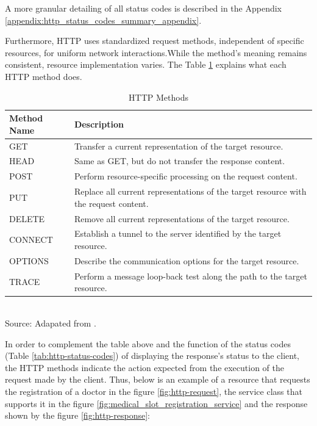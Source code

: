 A more granular detailing of all status codes is described in the Appendix \ref{appendix:http_status_codes_summary_appendix}.

Furthermore, HTTP uses standardized request methods, independent of specific resources, for uniform network interactions.While the method's meaning remains consistent, resource implementation varies. The Table \ref{tab:http-methods} explains what each HTTP method does.

\begin{table}[H]
\centering
\caption{HTTP Methods}
\label{tab:http-methods}
\begin{tabular}{lp{6cm}} %
\textbf{Method Name} & \textbf{Description} \\ \hline
GET & Transfer a current representation of the target resource. \\ \hline
HEAD & Same as GET, but do not transfer the response content. \\ \hline
POST & Perform resource-specific processing on the request content. \\ \hline
PUT & Replace all current representations of the target resource with the request content. \\ \hline
DELETE & Remove all current representations of the target resource. \\ \hline
CONNECT & Establish a tunnel to the server identified by the target resource. \\\hline
OPTIONS & Describe the communication options for the target resource. \\ \hline
TRACE & Perform a message loop-back test along the path to the target resource. \\ \hline
\end{tabular}
\\ \footnotesize Source: Adapated from \cite{rfc9110}.
\end{table}

In order to complement the table above and the function of the status codes (Table \ref{tab:http-status-codes}) of displaying the response's status to the client, the HTTP methods indicate the action expected from the execution of the request made by the client. Thus, below is an example of a resource that requests the registration of a doctor in the figure \ref{fig:http-request}, the service class that supports it in the figure \ref{fig:medical_slot_registration_service} and the response shown by the figure \ref{fig:http-response}:

